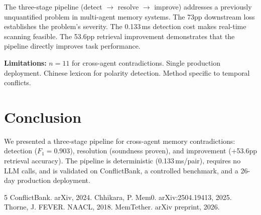 \documentclass{article}
\begin{document}
The three-stage pipeline (detect $\to$ resolve $\to$ improve) addresses a previously unquantified problem in multi-agent memory systems. The 73pp downstream loss establishes the problem's severity. The 0.133\,ms detection cost makes real-time scanning feasible. The 53.6pp retrieval improvement demonstrates that the pipeline directly improves task performance.

\textbf{Limitations:} $n{=}11$ for cross-agent contradictions. Single production deployment. Chinese lexicon for polarity detection. Method specific to temporal conflicts.

\section{Conclusion}

We presented a three-stage pipeline for cross-agent memory contradictions: detection ($F_1=0.903$), resolution (soundness proven), and improvement (+53.6pp retrieval accuracy). The pipeline is deterministic (0.133\,ms/pair), requires no LLM calls, and is validated on ConflictBank, a controlled benchmark, and a 26-day production deployment.

\begin{thebibliography}{5}
 ConflictBank. arXiv, 2024.
 Chhikara, P. Mem0. arXiv:2504.19413, 2025.
 Thorne, J. FEVER. NAACL, 2018.
 MemTether. arXiv preprint, 2026.
\end{thebibliography}
\end{document}
